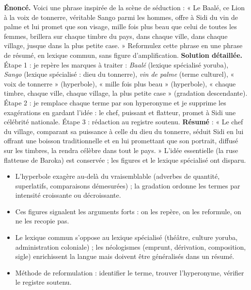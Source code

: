 \documentclass[11pt]{article}
\newcommand{\cle}[1]{{\popxbold\color{popdark}#1}}
\begin{document}
\begin{exoresolu}
\textbf{Énoncé.} Voici une phrase inspirée de la scène de séduction : « Le Baalé, ce Lion à la voix de tonnerre, véritable Sango parmi les hommes, offre à Sidi du vin de palme et lui promet que son visage, mille fois plus beau que celui de toutes les femmes, brillera sur chaque timbre du pays, dans chaque ville, dans chaque village, jusque dans la plus petite case. » Reformulez cette phrase en une phrase de résumé, en lexique commun, sans figure d'amplification.
\tcblower
\textbf{Solution détaillée.} Étape 1 : je repère les marques à traiter : \emph{Baalé} (lexique spécialisé yoruba), \emph{Sango} (lexique spécialisé : dieu du tonnerre), \emph{vin de palme} (terme culturel), « voix de tonnerre » (hyperbole), « mille fois plus beau » (hyperbole), « chaque timbre, chaque ville, chaque village, la plus petite case » (gradation descendante). Étape 2 : je remplace chaque terme par son hyperonyme et je supprime les exagérations en gardant l'idée : le chef, puissant et flatteur, promet à Sidi une célébrité nationale. Étape 3 : rédaction au registre soutenu. \textbf{Résumé} : « Le chef du village, comparant sa puissance à celle du dieu du tonnerre, séduit Sidi en lui offrant une boisson traditionnelle et en lui promettant que son portrait, diffusé sur les timbres, la rendra célèbre dans tout le pays. » L'idée essentielle (la ruse flatteuse de Baroka) est conservée ; les figures et le lexique spécialisé ont disparu.
\end{exoresolu}

\begin{aretenir}
\begin{itemize}
\item L'\cle{hyperbole} exagère au-delà du vraisemblable (adverbes de quantité, superlatifs, comparaisons démesurées) ; la \cle{gradation} ordonne les termes par intensité croissante ou décroissante.
\item Ces figures signalent les arguments forts : on les repère, on les reformule, on ne les recopie pas.
\item Le \cle{lexique commun} s'oppose au \cle{lexique spécialisé} (théâtre, culture yoruba, administration coloniale) ; les \cle{néologismes} (emprunt, dérivation, composition, sigle) enrichissent la langue mais doivent être généralisés dans un résumé.
\item Méthode de reformulation : identifier le terme, trouver l'hyperonyme, vérifier le registre soutenu.
\end{itemize}
\end{aretenir}
\end{document}

